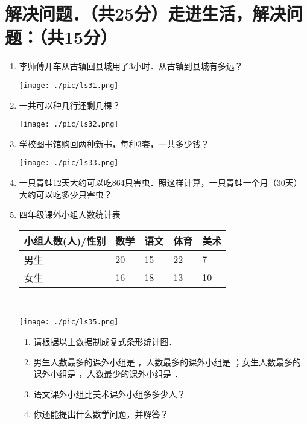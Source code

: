 \documentclass[12pt,twoside,space]{ctexart}
\begin{document}
    \section{解决问题．（共25分）走进生活，解决问题：（共15分）}
      \begin{enumerate}[itemsep=3.5em,topsep=0pt]
        \item 李师傅开车从古镇回县城用了3小时．从古镇到县城有多远？ \\[0.5em]
          \begin{minipage}{\linewidth}
            \texttt{[image: ./pic/ls31.png]}
          \end{minipage}

        \item 一共可以种几行还剩几棵？\\[0.5em]
          \begin{minipage}{\linewidth}
            \texttt{[image: ./pic/ls32.png]}
          \end{minipage}

        \item 学校图书馆购回两种新书，每种3套，一共多少钱？\\[0.5em]
          \begin{minipage}{\linewidth}
            \texttt{[image: ./pic/ls33.png]}
          \end{minipage}

        \item 一只青蛙12天大约可以吃864只害虫．照这样计算，一只青蛙一个月（30天）大约可以吃多少只害虫？
        \item 四年级课外小组人数统计表\\[0.5em]
            \begin{tabular}{|l|l|l|l|l|}
            \hline
            小组人数(人)/性别 & 数学 & 语文 & 体育 & 美术 \\ \hline
            男生 & 20 & 15 & 22 & 7 \\ \hline
            女生 & 16 & 18 & 13 & 10 \\ \hline
            \end{tabular}\\[0.5em]

            \begin{minipage}{\linewidth}
              \texttt{[image: ./pic/ls35.png]}
            \end{minipage}

            \begin{enumerate}[align=left,labelsep=-0.3em,leftmargin=1.2em,noitemsep,topsep=0pt,label={(\arabic*)}]
              \item 请根据以上数据制成复式条形统计图．
              \item 男生人数最多的课外小组是 ，人数最多的课外小组是 ；女生人数最多的课外小组是 ，人数最少的课外小组是 ．
              \item 语文课外小组比美术课外小组多多少人？
              \item 你还能提出什么数学问题，并解答？
            \end{enumerate}
      \end{enumerate}
\end{document}
